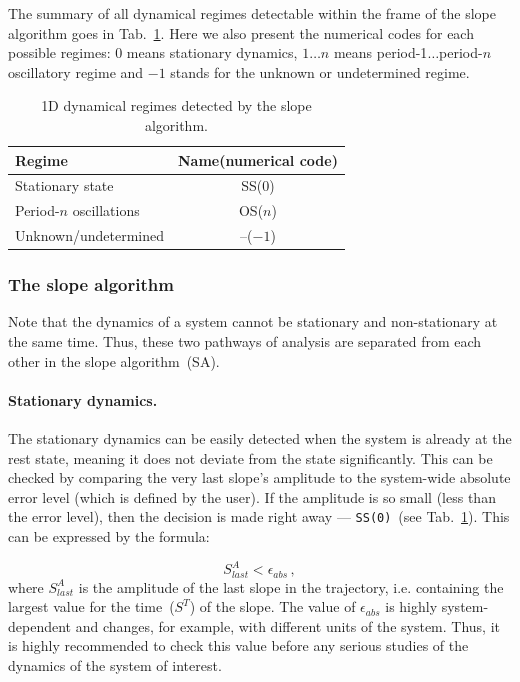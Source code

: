 \documentclass[11pt,a4paper]{article}
\begin{document}
The summary of all dynamical regimes detectable within the frame of the slope
algorithm goes in Tab.~\ref{tab:1}. Here we also present the numerical codes for
each possible regimes: 0 means stationary dynamics, $1\ldots n$ means
period-1$\ldots$period-$n$ oscillatory regime and $-1$ stands for the unknown or
undetermined regime.

\begin{table}[h]
  \centering
  \begin{tabular}[h]{|l|c|}
    \hline{}
    \textbf{Regime} & \textbf{Name}(\textbf{numerical code})\\
    \hline{}
    Stationary state & SS(0)\\
    \hline{}
    Period-$n$ oscillations & OS($n$) \\
    \hline{}
    Unknown/undetermined & --($-1$)\\
    \hline
  \end{tabular}
  \caption{1D dynamical regimes detected by the slope algorithm.}
  \label{tab:1}
\end{table}

\subsubsection{The slope algorithm}
\label{sec:body-slope-algorithm}

Note that the dynamics of a system cannot be stationary and non-stationary at the
same time. Thus, these two pathways of analysis are separated from each other in the
slope algorithm~(SA).

\paragraph{Stationary dynamics.}

The stationary dynamics can be easily detected when the system is already at the rest
state, meaning it does not deviate from the state significantly. This can be checked
by comparing the very last slope's amplitude to the system-wide absolute error level
(which is defined by the user). If the amplitude is so small (less than the error
level), then the decision is made right away --- \texttt{SS(0)}~(see
Tab.~\ref{tab:1}). This can be expressed by the formula:

\begin{equation}
  \label{eq:ss_abs}
  S^A_{last} < \epsilon_{abs}\,,
\end{equation}
where $S^A_{last}$ is the amplitude of the last slope in the trajectory,
i.e. containing the largest value for the time~($S^T$) of the slope. The value
of $\epsilon_{abs}$ is highly system-dependent and changes, for example, with
different units of the system. Thus, it is highly recommended to check this value
before any serious studies of the dynamics of the system of interest.
\end{document}

